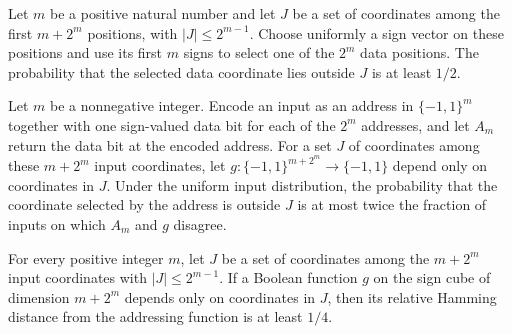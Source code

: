 \begin{theorem}
\label{FABL.uniformProbability_addressingSelectedOutside_ge_half}
\leanok
{}
Let $m$ be a positive natural number and let $J$ be a set of coordinates among the first
$m+2^m$ positions, with $|J|\le 2^{m-1}$. Choose uniformly a sign vector on these
positions and use its first $m$ signs to select one of the $2^m$ data positions. The
probability that the selected data coordinate lies outside $J$ is at least $1/2$.
\end{theorem}

\begin{theorem}
\label{FABL.two_mul_relativeHammingDist_addressing_ge_event}
\leanok
{}
Let $m$ be a nonnegative integer. Encode an input as an address in $\{-1,1\}^m$ together
with one sign-valued data bit for each of the $2^m$ addresses, and let $A_m$ return the
data bit at the encoded address. For a set $J$ of coordinates among these $m+2^m$ input
coordinates, let $g:\{-1,1\}^{m+2^m}\to\{-1,1\}$ depend only on coordinates in $J$.
Under the uniform input distribution, the probability that the coordinate selected by
the address is outside $J$ is at most twice the fraction of inputs on which $A_m$ and
$g$ disagree.
\end{theorem}

\begin{theorem}
\label{FABL.relativeHammingDist_addressing_ge_quarter}
\leanok
{}
For every positive integer $m$, let $J$ be a set of coordinates among the $m+2^m$ input
coordinates with $|J|\le 2^{m-1}$. If a Boolean function $g$ on the sign cube of
dimension $m+2^m$ depends only on coordinates in $J$, then its relative Hamming distance
from the addressing function is at least $1/4$.
\end{theorem}

